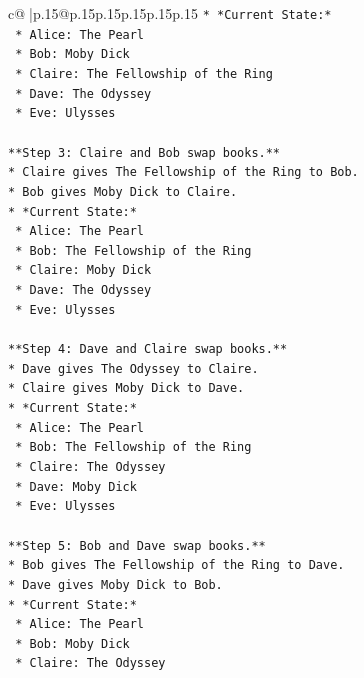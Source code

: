 \documentclass{article}
\begin{document}
{\begin{supertabular}{c@{$\;$}|p{.15\linewidth}@{}p{.15\linewidth}p{.15\linewidth}p{.15\linewidth}p{.15\linewidth}p{.15\linewidth}}
{{{\texttt{*   *Current State:*} \\
\texttt{    *   Alice: The Pearl} \\
\texttt{    *   Bob: Moby Dick} \\
\texttt{    *   Claire: The Fellowship of the Ring} \\
\texttt{    *   Dave: The Odyssey} \\
\texttt{    *   Eve: Ulysses} \\
\\ 
\texttt{**Step 3: Claire and Bob swap books.**} \\
\texttt{*   Claire gives The Fellowship of the Ring to Bob.} \\
\texttt{*   Bob gives Moby Dick to Claire.} \\
\texttt{*   *Current State:*} \\
\texttt{    *   Alice: The Pearl} \\
\texttt{    *   Bob: The Fellowship of the Ring} \\
\texttt{    *   Claire: Moby Dick} \\
\texttt{    *   Dave: The Odyssey} \\
\texttt{    *   Eve: Ulysses} \\
\\ 
\texttt{**Step 4: Dave and Claire swap books.**} \\
\texttt{*   Dave gives The Odyssey to Claire.} \\
\texttt{*   Claire gives Moby Dick to Dave.} \\
\texttt{*   *Current State:*} \\
\texttt{    *   Alice: The Pearl} \\
\texttt{    *   Bob: The Fellowship of the Ring} \\
\texttt{    *   Claire: The Odyssey} \\
\texttt{    *   Dave: Moby Dick} \\
\texttt{    *   Eve: Ulysses} \\
\\ 
\texttt{**Step 5: Bob and Dave swap books.**} \\
\texttt{*   Bob gives The Fellowship of the Ring to Dave.} \\
\texttt{*   Dave gives Moby Dick to Bob.} \\
\texttt{*   *Current State:*} \\
\texttt{    *   Alice: The Pearl} \\
\texttt{    *   Bob: Moby Dick} \\
\texttt{    *   Claire: The Odyssey} \\
}}}
\end{supertabular}}
\end{document}
